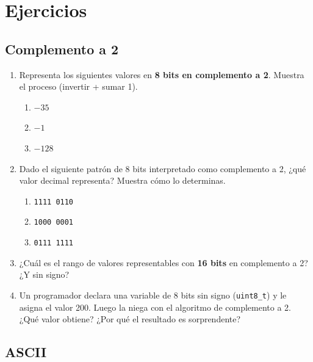 \documentclass[12pt, oneside]{article}
\begin{document}
\section{Ejercicios}

\subsection{Complemento a 2}

\begin{enumerate}

  \item Representa los siguientes valores en \textbf{8 bits en complemento
        a 2}. Muestra el proceso (invertir + sumar 1).
        \begin{enumerate}
          \item $-35$
          \item $-1$
          \item $-128$
        \end{enumerate}

  \item Dado el siguiente patrón de 8 bits interpretado como complemento
        a 2, ¿qué valor decimal representa? Muestra cómo lo determinas.
        \begin{enumerate}
          \item \texttt{1111 0110}
          \item \texttt{1000 0001}
          \item \texttt{0111 1111}
        \end{enumerate}

  \item ¿Cuál es el rango de valores representables con \textbf{16 bits}
        en complemento a 2? ¿Y sin signo?

  \item Un programador declara una variable de 8 bits sin signo
        (\texttt{uint8\_t}) y le asigna el valor 200. Luego la niega
        con el algoritmo de complemento a 2. ¿Qué valor obtiene?
        ¿Por qué el resultado es sorprendente?

\end{enumerate}

\subsection{ASCII}
\end{document}

